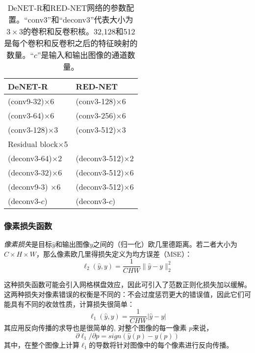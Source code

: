 \begin{table}
\vspace{-4mm}
\centering
\caption[DeNET-R和RED-NET网络的配置参数表]{DeNET-R和RED-NET网络的参数配置。“conv3”和“deconv3”代表大小为$ 3 \times3 $的卷积和反卷积核。32,128和512是每个卷积和反卷积之后的特征映射的数量。“$ c $”是输入和输出图像的通道数量。}
\begin{tabular}{l | l }\hline
DeNET-R                   &RED-NET                \\ \hline
(conv9-32)$\times$6             &(conv3-128)$\times$6       \\ \hline
(conv3-64)$\times$6             &(conv3-256)$\times$6       \\ \hline
(conv3-128)$\times$3             &(conv3-512)$\times$3       \\ \hline
Residual block$\times$5 &                           \\ \hline
(deconv3-64)$\times$2           &(deconv3-512)$\times$2       \\ \hline
(deconv3-32)$\times$6           &(deconv3-512)$\times$6       \\ \hline
(deconv9-3) $\times$6           &(deconv3-512)$\times$6       \\ \hline
(deconv3-$c$)           &(deconv3-$c$)                \\ \hline
\end{tabular}
\label{table1}
\end{table}
\subsubsection{像素损失函数}
\emph{像素损失}是目标$ \hat y $和输出图像$ y $之间的（归一化）欧几里德距离。若二者大小为$ C \times H \times W $，那么像素欧几里得损失定义为均方误差（MSE）：
 \begin{equation}
   \ell_2(\hat y, y) = \frac{1}{CHW}\|\hat y - y\|_2^2
  \end{equation}

这种损失函数可能会引入网格棋盘效应，因此可引入了\lone 范数正则化损失加以缓解。这两种损失对像素错误的权衡是不同的：\lone 不会过度惩罚更大的错误值，因此它们可能具有不同的收敛性质，计算\lone 损失很简单：
\begin{equation}
\ell_1(\hat y, y) = \frac{1}{CHW}| \hat y - y|
\end{equation}
其应用反向传播的求导也是很简单的, 对整个图像的每一像素 $p$来说，
\begin{equation}
\partial \ell_1/\partial p  = sign\left(\hat y(p) - y(p)\right)
\end{equation}
其中，在整个图像上计算$ \ell_1 $的导数将针对图像中的每个像素进行反向传播。

